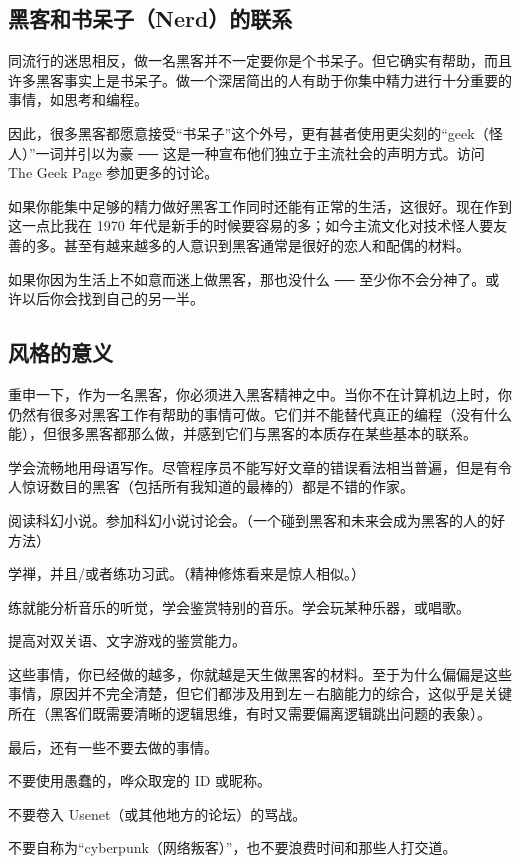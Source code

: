 \subsection{黑客和书呆子（Nerd）的联系}
同流行的迷思相反，做一名黑客并不一定要你是个书呆子。但它确实有帮助，而且许多黑客事实上是书呆子。做一个深居简出的人有助于你集中精力进行十分重要的事情，如思考和编程。

因此，很多黑客都愿意接受“书呆子”这个外号，更有甚者使用更尖刻的“geek（怪人）”一词并引以为豪 ── 这是一种宣布他们独立于主流社会的声明方式。访问 The Geek Page 参加更多的讨论。

如果你能集中足够的精力做好黑客工作同时还能有正常的生活，这很好。现在作到这一点比我在 1970 年代是新手的时候要容易的多；如今主流文化对技术怪人要友善的多。甚至有越来越多的人意识到黑客通常是很好的恋人和配偶的材料。

如果你因为生活上不如意而迷上做黑客，那也没什么 ── 至少你不会分神了。或许以后你会找到自己的另一半。


\subsection{风格的意义}
重申一下，作为一名黑客，你必须进入黑客精神之中。当你不在计算机边上时，你仍然有很多对黑客工作有帮助的事情可做。它们并不能替代真正的编程（没有什么能），但很多黑客都那么做，并感到它们与黑客的本质存在某些基本的联系。


学会流畅地用母语写作。尽管程序员不能写好文章的错误看法相当普遍，但是有令人惊讶数目的黑客（包括所有我知道的最棒的）都是不错的作家。

阅读科幻小说。参加科幻小说讨论会。（一个碰到黑客和未来会成为黑客的人的好方法）

学禅，并且/或者练功习武。（精神修炼看来是惊人相似。）

练就能分析音乐的听觉，学会鉴赏特别的音乐。学会玩某种乐器，或唱歌。

提高对双关语、文字游戏的鉴赏能力。

这些事情，你已经做的越多，你就越是天生做黑客的材料。至于为什么偏偏是这些事情，原因并不完全清楚，但它们都涉及用到左－右脑能力的综合，这似乎是关键所在（黑客们既需要清晰的逻辑思维，有时又需要偏离逻辑跳出问题的表象）。

最后，还有一些不要去做的事情。


不要使用愚蠢的，哗众取宠的 ID 或昵称。

不要卷入 Usenet（或其他地方的论坛）的骂战。

不要自称为“cyberpunk（网络叛客）”，也不要浪费时间和那些人打交道。

